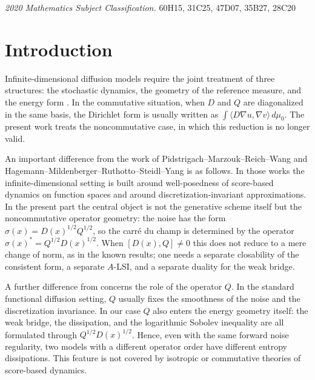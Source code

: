 \documentclass{article}
\newcommand{\subjclass}[2][2020]{%
  \par\addvspace\medskipamount
  {\small\textit{2020 Mathematics Subject Classification.} #2\par}}
\begin{document}
\subjclass[2020]{60H15, 31C25, 47D07, 35B27, 28C20}

\section{Introduction}

Infinite-dimensional diffusion models require the joint treatment of three
structures: the stochastic dynamics, the geometry of the reference measure,
and the energy form
\cite{DaPratoZabczyk,PrevotRockner,BogachevGaussian}. In the commutative
situation, when \(D\) and \(Q\) are diagonalized in the same basis, the
Dirichlet form is usually written as \(\int\langle D\nabla u,\nabla v\rangle\,d\mu_0\).
The present work treats the noncommutative case, in which this reduction is
no longer valid.


An important difference from the work of Pidstrigach--Marzouk--Reich--Wang and
Hagemann--Mildenberger--Ruthotto--Steidl--Yang
\cite{Pidstrigach2024,Hagemann2025} is as follows. In those works the
infinite-dimensional setting is built around well-posedness of score-based
dynamics on function spaces and around discretization-invariant
approximations. In the present part the central object is not the generative
scheme itself but the noncommutative operator geometry: the noise has the form
\(\sigma(x)=D(x)^{1/2}Q^{1/2}\), so the carr\'e du champ is determined by the
operator \(\sigma(x)^*=Q^{1/2}D(x)^{1/2}\). When \([D(x),Q]\ne0\) this does not
reduce to a mere change of norm, as in the known results; one needs a separate
closability of the consistent form, a separate \(A\)-LSI, and a separate
duality for the weak bridge.

A further difference from
\cite{Pidstrigach2024,Hagemann2025} concerns the role of the operator \(Q\).
In the standard functional diffusion setting, \(Q\) usually fixes the
smoothness of the noise and the discretization invariance. In our case \(Q\)
also enters the energy geometry itself: the weak bridge, the dissipation, and
the logarithmic Sobolev inequality are all formulated through
\(Q^{1/2}D(x)^{1/2}\). Hence, even with the same forward noise regularity, two
models with a different operator order have different entropy
dissipations. This feature is not covered by isotropic or commutative theories
of score-based dynamics.
\end{document}
